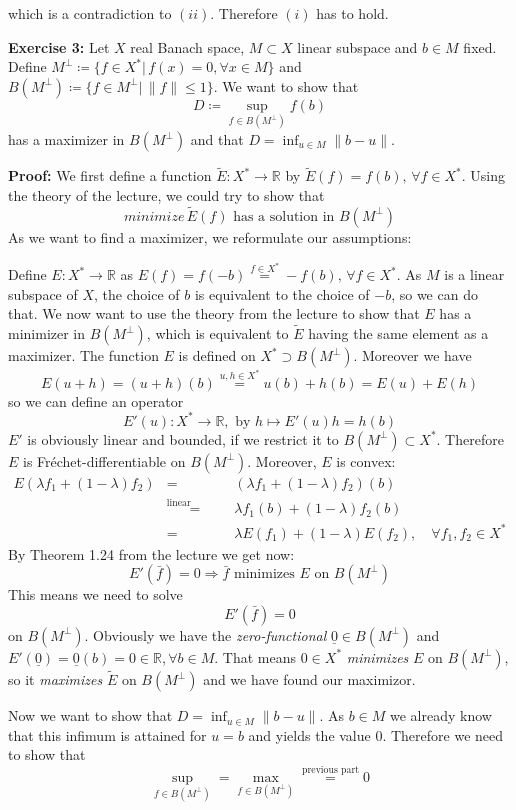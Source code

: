 \documentclass[a4paper]{amsart}
\begin{document}
	which is a contradiction to $(ii)$. Therefore $(i)$ has to hold.\par\par


	\textbf{Exercise 3: } Let $X$ real Banach space, $M\subset X$ linear subspace and $b\in M$ fixed. Define $M^\perp \coloneqq\{f\in X^*\vert\, f(x) = 0,\forall x\in M\}$ and $B(M^\perp) \coloneqq \{ f\in M^\perp\vert\, \|f\| \leq 1\}$. We want to show that
	\[
		D\coloneqq \sup_{f\in B(M^\perp)} f(b)
	\]
	has a maximizer in $B(M^\perp)$ and that $D=\inf_{u\in M}\|b-u\|$.\par
	\textbf{Proof: } We first define a function $\tilde{E}: X^*\to\mathbb{R}$ by $\tilde{E}(f) = f(b),\,\forall f\in X^*$. Using the theory of the lecture, we could try to show that 
	\[
		minimize\,\tilde{E}(f) \text{ has a solution in } B(M^\perp) 
	\]
	As we want to find a maximizer, we reformulate our assumptions: \par
	Define $E:X^*\to\mathbb{R}$ as $E(f) = f(-b) \overset{f\in X^*}= -f(b),\,\forall f\in X^*$. As $M$ is a linear subspace of $X$, the choice of $b$ is equivalent to the choice of $-b$, so we can do that. We now want to use the theory from the lecture to show that $E$ has a minimizer in $B(M^\perp)$, which is equivalent to $\tilde{E}$ having the same element as a maximizer. The function $E$ is defined on $X^*\supset B(M^\perp)$. Moreover we have
	\[
		E(u+h) = (u+h)(b) \overset{u,h\in X^*}= u(b)+h(b) = E(u)+E(h)
	\]
	so we can define an operator
	\[
		E'(u): X^*\to\mathbb{R},\text{ by } h \mapsto E'(u)h = h(b)
	\]
	$E'$ is obviously linear and bounded, if we restrict it to $B(M^\perp)\subset X^*$. Therefore $E$ is Fréchet-differentiable on $B(M^\perp)$.
	Moreover, $E$ is convex:
	\begin{eqnarray*}
		E(\lambda f_1 + (1-\lambda)f_2) &=& (\lambda f_1 + (1-\lambda)f_2)(b) \\
		&\overset{\text{linear functionals}}=& \lambda f_1(b) + (1-\lambda)f_2(b)\\
		&=& \lambda E(f_1) + (1-\lambda)E(f_2),\quad\forall f_1,f_2\in X^*
	\end{eqnarray*}
	By Theorem 1.24 from the lecture we get now:
	\[
		E'(\bar{f}) = 0 \Longrightarrow \bar{f} \text{ minimizes }E \text{ on }B(M^\perp)
	\]
	This means we need to solve
	\[
		E'(\bar{f}) = 0
	\]
	on $B(M^\perp)$. Obviously we have the \emph{zero-functional} $\underline{0}\in B(M^\perp)$ and $E'(\underline{0}) = \underline{0}(b) = 0\in\mathbb{R}, \forall b\in M$. That means $0\in X^*$ \emph{minimizes} $E$ on $B(M^\perp)$, so it \emph{maximizes} $\tilde{E}$ on $B(M^\perp)$ and we have found our maximizor.\par
	Now we want to show that $D = \inf_{u\in M} \|b-u\|$. As $b\in M$ we already know that this infimum is attained for $u = b$ and yields the value $0$. Therefore we need to show that 
	\[
		\sup_{f\in B(M^\perp)} = \max_{f\in B(M^\perp)} \overset{\text{previous part}}= 0
	\]
\end{document}
